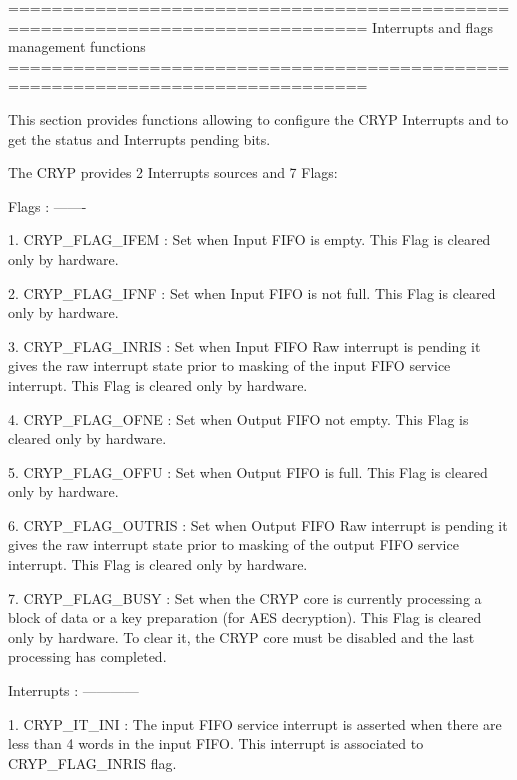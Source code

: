 \begin{DoxyVerb} ===============================================================================
                   Interrupts and flags management functions
 ===============================================================================  

  This section provides functions allowing to configure the CRYP Interrupts and 
  to get the status and Interrupts pending bits.

  The CRYP provides 2 Interrupts sources and 7 Flags:

  Flags :
  ------- 
                          
     1. CRYP_FLAG_IFEM :  Set when Input FIFO is empty.
                          This Flag is cleared only by hardware.
      
     2. CRYP_FLAG_IFNF :  Set when Input FIFO is not full.
                          This Flag is cleared only by hardware.


     3. CRYP_FLAG_INRIS  : Set when Input FIFO Raw interrupt is pending 
                           it gives the raw interrupt state prior to masking 
                           of the input FIFO service interrupt.
                           This Flag is cleared only by hardware.
     
     4. CRYP_FLAG_OFNE   : Set when Output FIFO not empty.
                           This Flag is cleared only by hardware.
        
     5. CRYP_FLAG_OFFU   : Set when Output FIFO is full.
                           This Flag is cleared only by hardware.
                           
     6. CRYP_FLAG_OUTRIS : Set when Output FIFO Raw interrupt is pending 
                           it gives the raw interrupt state prior to masking 
                           of the output FIFO service interrupt.
                           This Flag is cleared only by hardware.
                               
     7. CRYP_FLAG_BUSY   : Set when the CRYP core is currently processing a 
                           block of data or a key preparation (for AES 
                           decryption).
                           This Flag is cleared only by hardware.
                           To clear it, the CRYP core must be disabled and the 
                           last processing has completed. 

  Interrupts :
  ------------

   1. CRYP_IT_INI   : The input FIFO service interrupt is asserted when there 
                      are less than 4 words in the input FIFO.
                      This interrupt is associated to CRYP_FLAG_INRIS flag.


\end{DoxyVerb}
